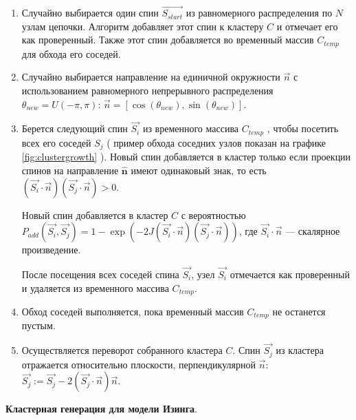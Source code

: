 \begin{enumerate}
	
		\item Случайно выбирается один спин  $\overrightarrow{S_{start}}$ из равномерного распределения по $N$ узлам цепочки.
	Алгоритм добавляет этот спин к кластеру $C$ и отмечает его как проверенный.
	Также этот спин добавляется во временный массив $C_{temp}$ для обхода его соседей.  
	
	\item Случайно выбирается направление на единичной окружности $\overrightarrow{n}$ с использованием равномерного непрерывного распределения $ \theta_{new} = U(-\pi, \pi)$: $\overrightarrow{n} = [\cos(\theta_{new}), \sin(\theta_{new})]$.

	\item Берется следующий спин $ \overrightarrow{S_{i}}$  из временного массива $C_{temp}$ , чтобы посетить всех его соседей $S_j$ (  пример обхода соседних узлов показан на графике \ref{fig:clustergrowth} ). 
		Новый спин добавляется в кластер только если проекции спинов на направление $\hat{\mathbf n}$ имеют одинаковый знак, то есть $( \overrightarrow{S_{i}}\!\cdot\!\overrightarrow{n} )( \overrightarrow{S_j}\!\cdot\!\overrightarrow{n} )>0$. 
	
	 Новый спин добавляется в кластер $C$ с вероятностью $P_{add}(\overrightarrow{S_{i}}, \overrightarrow{S_j} ) = 1 - \exp \left(-2J (\overrightarrow{S_{i}}\!\cdot\!\overrightarrow{n})( \overrightarrow{S_j}\!\cdot\!\overrightarrow{n} ) \right)$, где  $\overrightarrow{S_{i}}\!\cdot\!\overrightarrow{n}$ --- скалярное произведение. 

	
	После посещения всех соседей спина $ \overrightarrow{S_{i}}$,  узел   $ \overrightarrow{S_{i}}$ отмечается как проверенный и  удаляется из временного массива $C_{temp}$.
	
	\item Обход соседей выполняется, пока временный массив $C_{temp}$ не останется пустым. 
	 
		 \item Осуществляется переворот собранного кластера $C$. Спин $\overrightarrow{S_j} $ из кластера отражается относительно плоскости, перпендикулярной $\vec n$: $\overrightarrow{S_j} := \overrightarrow{S_j} - 2 ( \overrightarrow{S_j}\!\cdot\!\vec{n}) \vec{n}$. 

\end{enumerate}

\textbf{Кластерная генерация для  модели Изинга}. 
 

